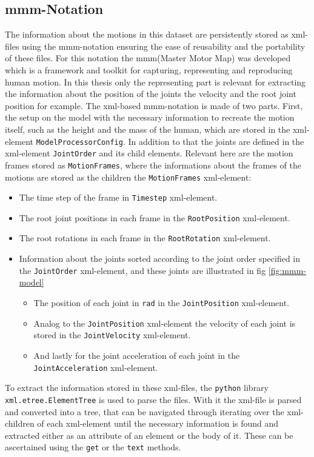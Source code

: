 \subsection{mmm-Notation} \label{subsec:mmm-notation}
The information about the motions in this dataset are persistently stored as xml-files using the mmm-notation ensuring the ease of reusability and the portability of these files. For this notation the mmm(Master Motor Map) was developed which is a framework and toolkit for capturing, representing and reproducing human motion. In this thesis only the representing part is relevant for extracting the information about the position of the joints the velocity and the root joint position for example\cite{mmm2014}. The xml-based mmm-notation is made of two parts. First, the setup on the model with the necessary information to recreate the motion itself, such as the height and the mass of the human, which are stored in the xml-element \texttt{ModelProcessorConfig}. In addition to that the joints are defined in the xml-element \texttt{JointOrder} and its child elements. Relevant here are the motion frames stored as \texttt{MotionFrames}, where the informations about the frames of the motions are stored as the children the \texttt{MotionFrames} xml-element:
\begin{itemize}
	\item The time step of the frame in \texttt{Timestep} xml-element.
	\item The root joint positions in each frame in the \texttt{RootPosition} xml-element.
	\item The root rotations in each frame in the \texttt{RootRotation} xml-element.
	\item Information about the joints sorted according to the joint order specified in the \texttt{JointOrder} xml-element, and these joints are illustrated in fig \ref{fig:mmm-model}
	\begin{itemize}
		\item The position of each joint in \texttt{rad} in the \texttt{JointPosition} xml-element.
		\item Analog to the \texttt{JointPosition} xml-element the velocity of each joint is stored in the \texttt{JointVelocity} xml-element.
		\item And lastly for the joint acceleration of each joint in the \texttt{JointAcceleration} xml-element.
	\end{itemize}
\end{itemize}
To extract the information stored in these xml-files, the \texttt{python} library \texttt{xml.etree.ElementTree} is used to parse the files. With it the xml-file is parsed and converted into a tree, that can be navigated through iterating over the xml-children of each xml-element until the necessary information is found and extracted either as an attribute of an element or the body of it. These can be ascertained using the \texttt{get} or the \texttt{text} methods. 
